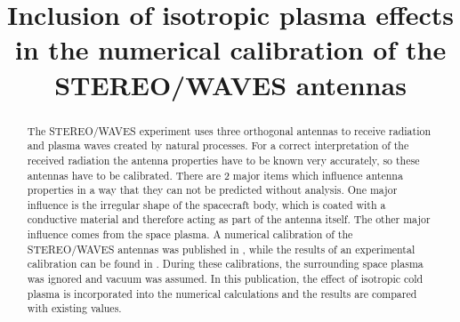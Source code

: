 \documentclass[two-coloumn,ras]{agutex}
\begin{document}
%
%


\title{Inclusion of isotropic plasma effects in the numerical calibration of the STEREO/WAVES antennas}
%

%
%









%
%


\begin{abstract}
The STEREO/WAVES experiment uses three orthogonal antennas to receive radiation and plasma waves created by natural processes. For a correct interpretation of the received radiation the antenna properties have to be known very accurately, so these antennas have to be calibrated. There are 2 major items which influence antenna properties in a way that they can not be predicted without analysis. One major influence is the irregular shape of the spacecraft body, which is coated with a conductive material and therefore acting as part of the antenna itself. The other major influence comes from the space plasma. A numerical calibration of the STEREO/WAVES antennas was published in \cite{ossi09}, while the results of an experimental calibration can be found in \cite{macher07}. During these calibrations, the surrounding space plasma was ignored and vacuum was assumed. In this publication, the effect of isotropic cold plasma is incorporated into the numerical calculations and the results are compared with existing values.
\end{abstract}
\end{document}
